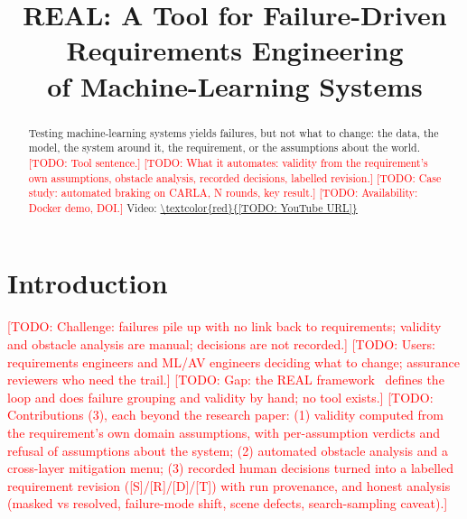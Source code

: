 \documentclass[10pt,conference]{IEEEtran}
\newcommand{\todo}[1]{\textcolor{red}{[TODO: #1]}}
\begin{document}
\title{REAL: A Tool for Failure-Driven Requirements Engineering\\of Machine-Learning Systems}

\author{\IEEEauthorblockN{\todo{Author 1}}
\IEEEauthorblockA{\todo{Affiliation}\\\todo{email}}
\and
\IEEEauthorblockN{\todo{Author 2}}
\IEEEauthorblockA{\todo{Affiliation}\\\todo{email}}}

\maketitle

\begin{abstract}
Testing machine-learning systems yields failures, but not what to change:
the data, the model, the system around it, the requirement, or the
assumptions about the world. \todo{Tool sentence.} \todo{What it automates:
validity from the requirement's own assumptions, obstacle analysis,
recorded decisions, labelled revision.} \todo{Case study: automated braking on
CARLA, N rounds, key result.} \todo{Availability: Docker demo, DOI.}
Video: \url{\todo{YouTube URL}}
\end{abstract}

\section{Introduction}
\todo{Challenge: failures pile up with no link back to requirements; validity
and obstacle analysis are manual; decisions are not recorded.}
\todo{Users: requirements engineers and ML/AV engineers deciding what to
change; assurance reviewers who need the trail.}
\todo{Gap: the REAL framework~\cite{real2026} defines the loop and does failure
grouping and validity by hand; no tool exists.}
\todo{Contributions (3), each beyond the research paper:
(1) validity computed from the requirement's own domain assumptions, with
per-assumption verdicts and refusal of assumptions about the system;
(2) automated obstacle analysis and a cross-layer mitigation menu;
(3) recorded human decisions turned into a labelled requirement revision
([S]/[R]/[D]/[T]) with run provenance, and honest analysis (masked vs
resolved, failure-mode shift, scene defects, search-sampling caveat).}
\end{document}

